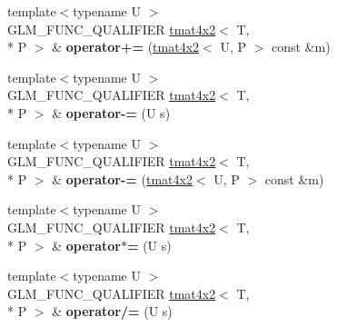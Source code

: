 \begin{DoxyCompactItemize}
\item 
\hypertarget{structglm_1_1detail_1_1tmat4x2_a39682439b0540114d8a90dfb96ff09e7}{{\footnotesize template$<$typename U $>$ }\\G\-L\-M\-\_\-\-F\-U\-N\-C\-\_\-\-Q\-U\-A\-L\-I\-F\-I\-E\-R \hyperlink{structglm_1_1detail_1_1tmat4x2}{tmat4x2}$<$ T, \\*
P $>$ \& {\bfseries operator+=} (\hyperlink{structglm_1_1detail_1_1tmat4x2}{tmat4x2}$<$ U, P $>$ const \&m)}\label{structglm_1_1detail_1_1tmat4x2_a39682439b0540114d8a90dfb96ff09e7}

\item 
\hypertarget{structglm_1_1detail_1_1tmat4x2_a1e70f82c8238bde1d32bb4398464079c}{{\footnotesize template$<$typename U $>$ }\\G\-L\-M\-\_\-\-F\-U\-N\-C\-\_\-\-Q\-U\-A\-L\-I\-F\-I\-E\-R \hyperlink{structglm_1_1detail_1_1tmat4x2}{tmat4x2}$<$ T, \\*
P $>$ \& {\bfseries operator-\/=} (U s)}\label{structglm_1_1detail_1_1tmat4x2_a1e70f82c8238bde1d32bb4398464079c}

\item 
\hypertarget{structglm_1_1detail_1_1tmat4x2_a85080df35d7d859072e4bdcd955747d5}{{\footnotesize template$<$typename U $>$ }\\G\-L\-M\-\_\-\-F\-U\-N\-C\-\_\-\-Q\-U\-A\-L\-I\-F\-I\-E\-R \hyperlink{structglm_1_1detail_1_1tmat4x2}{tmat4x2}$<$ T, \\*
P $>$ \& {\bfseries operator-\/=} (\hyperlink{structglm_1_1detail_1_1tmat4x2}{tmat4x2}$<$ U, P $>$ const \&m)}\label{structglm_1_1detail_1_1tmat4x2_a85080df35d7d859072e4bdcd955747d5}

\item 
\hypertarget{structglm_1_1detail_1_1tmat4x2_a2fc51001f24270fc2c93b824668678ad}{{\footnotesize template$<$typename U $>$ }\\G\-L\-M\-\_\-\-F\-U\-N\-C\-\_\-\-Q\-U\-A\-L\-I\-F\-I\-E\-R \hyperlink{structglm_1_1detail_1_1tmat4x2}{tmat4x2}$<$ T, \\*
P $>$ \& {\bfseries operator$\ast$=} (U s)}\label{structglm_1_1detail_1_1tmat4x2_a2fc51001f24270fc2c93b824668678ad}

\item 
\hypertarget{structglm_1_1detail_1_1tmat4x2_acfd79479bd1ebfb4a6c7c654d0648a5b}{{\footnotesize template$<$typename U $>$ }\\G\-L\-M\-\_\-\-F\-U\-N\-C\-\_\-\-Q\-U\-A\-L\-I\-F\-I\-E\-R \hyperlink{structglm_1_1detail_1_1tmat4x2}{tmat4x2}$<$ T, \\*
P $>$ \& {\bfseries operator/=} (U s)}\label{structglm_1_1detail_1_1tmat4x2_acfd79479bd1ebfb4a6c7c654d0648a5b}

\end{DoxyCompactItemize}


